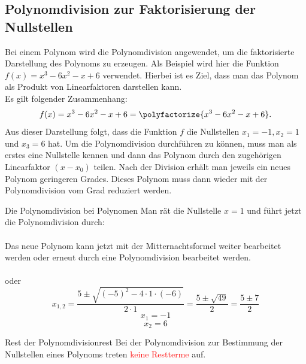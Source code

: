 \subsection{Polynomdivision zur Faktorisierung der Nullstellen}\label{polynomdivision}
    Bei einem Polynom wird die Polynomdivision angewendet, um die faktorisierte Darstellung des Polynoms zu erzeugen. Als Beispiel wird hier die Funktion $f(x) = x^3-6x^2-x+6$ verwendet. Hierbei ist es Ziel, dass man das Polynom als Produkt von Linearfaktoren darstellen kann.\\
    Es gilt folgender Zusammenhang: $$f(x) = x^3-6x^2-x+6 =  \polyfactorize{x^3-6x^2-x+6}.$$ Aus dieser Darstellung folgt, dass die Funktion $f$ die Nullstellen $x_1 = -1, x_2 = 1$ und $x_3= 6$ hat. Um die Polynomdivision durchführen zu können, muss man als erstes eine Nullstelle kennen und dann das Polynom durch den zugehörigen Linearfaktor $(x-x_0)$ teilen. Nach der Division erhält man jeweils ein neues Polynom geringeren Grades. Dieses Polynom muss dann wieder mit der Polynomdivision vom Grad reduziert werden.
    \begin{bsp}{Die Polynomdivision bei Polynomen}{} 
Man rät die Nullstelle $x=1$ und führt jetzt die Polynomdivision durch:\\
 \\
 Das neue Polynom kann jetzt mit der Mitternachtsformel weiter bearbeitet werden oder erneut durch eine Polynomdivision bearbeitet werden. \\
  \\
  oder
  $$ x_{1,2} = \dfrac{5\pm \sqrt{(-5)^2 - 4\cdot 1 \cdot (-6)}}{2\cdot 1} = \dfrac{5 \pm \sqrt{49} }{2} = \dfrac{5\pm 7}{2}$$
 $$ x_1 = -1$$
 $$ x_2= 6$$
\begin{center}
\end{center}
\end{bsp}
\begin{b8d}{Rest der Polynomdivision}{rest}
  Bei der Polynomdivision zur Bestimmung der Nullstellen eines Polynoms treten \textcolor{red}{keine Restterme} auf.   
\end{b8d}
